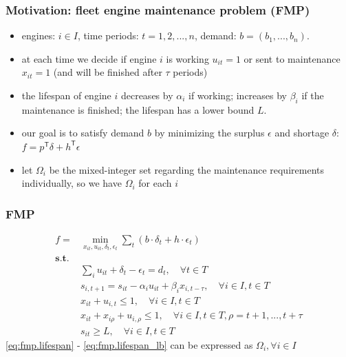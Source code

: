 \begin{frame}
  \frametitle{Motivation: fleet engine maintenance problem (FMP)}
  \begin{itemize}
    \item engines: \(i \in I\), time periods: \(t = 1, 2, ..., n\), demand: \(b = (b_1, ..., b_n)\).
    \item at each time we decide if engine \(i\) is working \(u_{it} = 1\) or sent to maintenance \(x_{it} = 1\) (and will be finished after \(\tau\) periods)
    \item the lifespan of engine \(i\) decreases by \(\alpha_i\) if working; increases by \(\beta_i\) if the maintenance is finished; the lifespan has a lower bound \(L\).
    \item our goal is to satisfy demand \(b\) by minimizing the surplus \(\epsilon\) and shortage \(\delta\): \(f=p^\mathsf{T}\delta + h^\mathsf{T}\epsilon\)
    \item let \(\Omega_i\) be the mixed-integer set regarding the maintenance requirements individually, so we have \(\Omega_i\) for each \(i\)
  \end{itemize}
\end{frame}

\begin{frame}
  \frametitle{FMP}
  \begin{align}
    \label{eq:fmp.obj}  f =    & \min_{x_{it}, u_{it}, \delta_t, \epsilon_t} \sum_t (b\cdot  \delta_t + h \cdot \epsilon_t)                                                            \\
    \nonumber \mathbf{s.t.}    &                                                                                                                                                       \\
    \label{eq:fmp.demand}      & \sum_i u_{it} + \delta_t - \epsilon_t = d_t                                                ,\quad\forall t \in T                                      \\
    \label{eq:fmp.lifespan}    & s_{i, t+1} =  s_{i t}  - \alpha_i  u_{it} + \beta_i  x_{i, t- \tau}                        ,\quad\forall i \in I, t \in T                             \\
    \label{eq:fmp.work_or_not} & x_{it} +  u_{i, t} \le 1                                                                  ,\quad \forall i \in I, t \in T                             \\
    \label{eq:fmp.leadtime}    & x_{it} + x_{i\rho} + u_{i, \rho} \le 1                                                     ,\quad \forall i \in I,  t\in T, \rho = t + 1, ..., t+\tau \\
    \label{eq:fmp.lifespan_lb} & s_{i t} \ge L                                                                              ,\quad \forall i \in I, t \in T
  \end{align}
  \eqref{eq:fmp.lifespan} - \eqref{eq:fmp.lifespan_lb} can be expressed as \(\Omega_i, \forall i \in I\)
\end{frame}

